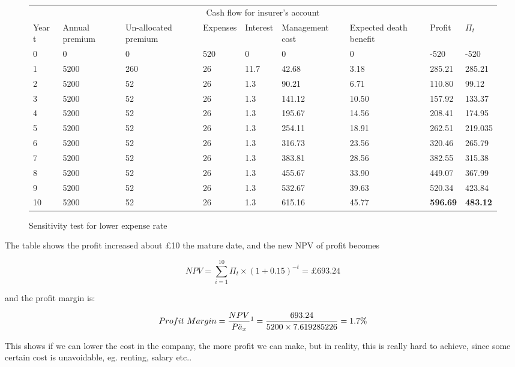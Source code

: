 \documentclass{report}
\begin{document}
\begin{figure}[H]
\hfill
\begin{tabular}{p{0.8cm} p{1.5cm} p{1.5cm} p{1.2cm} p{1cm} p{2cm}p{1.5cm} p{1.5cm} p{1.5cm} }
\toprule
\multicolumn{9}{c}{Cash flow for insurer's account} \\
\cmidrule(r){3-7}

Year t & Annual premium & Un-allocated premium & Expenses & Interest &Management cost& Expected death benefit & Profit& $\Pi_t$  \\
\midrule

0&0&0&520&0&0&0&-520&-520\\
1&5200&260&26&11.7&42.68&3.18&285.21&285.21\\
2&5200&52&26&1.3&90.21&6.71&110.80&99.12\\
3&5200&52&26&1.3&141.12&10.50&157.92&133.37\\
4&5200&52&26&1.3&195.67&14.56&208.41&174.95\\
5&5200&52&26&1.3&254.11&18.91&262.51&219.035\\
6&5200&52&26&1.3&316.73&23.56&320.46&265.79\\
7&5200&52&26&1.3&383.81&28.56&382.55&315.38\\
8&5200&52&26&1.3&455.67&33.90&449.07&367.99\\
9&5200&52&26&1.3&532.67&39.63&520.34&423.84\\
10&5200&52&26&1.3&615.16&45.77&\textbf{596.69}&\textbf{483.12}\\

\bottomrule
\end{tabular}
\caption{Sensitivity test for lower expense rate}
\label{determ-sensi-expense}
\end{figure}

The table shows the profit increased about \pounds 10 the mature date, and the new NPV of profit becomes 

\[
 NPV=\sum_{i=1}^{10} \Pi_t \times (1+0.15)^{-t} = \pounds693.24 
\]
 
and the profit margin is:

\[
Profit\ Margin =  \frac{NPV}{P \ddot{a}_x}\footnote{$\ddot{a}_x$=$\sum_{i=1}^{10} v^t {_tp_x}$=7.619285226, where $_tp_x$ read from table ?!?!?!? and $v=\frac{1}{1+0.05}$}  = \frac{693.24 }{5200 \times 7.619285226} = 1.7\%
\]


This shows if we can lower the cost in the company, the more profit we can make, but in reality, this is really hard to achieve, since some certain cost is unavoidable, eg. renting, salary etc..
\end{document}
